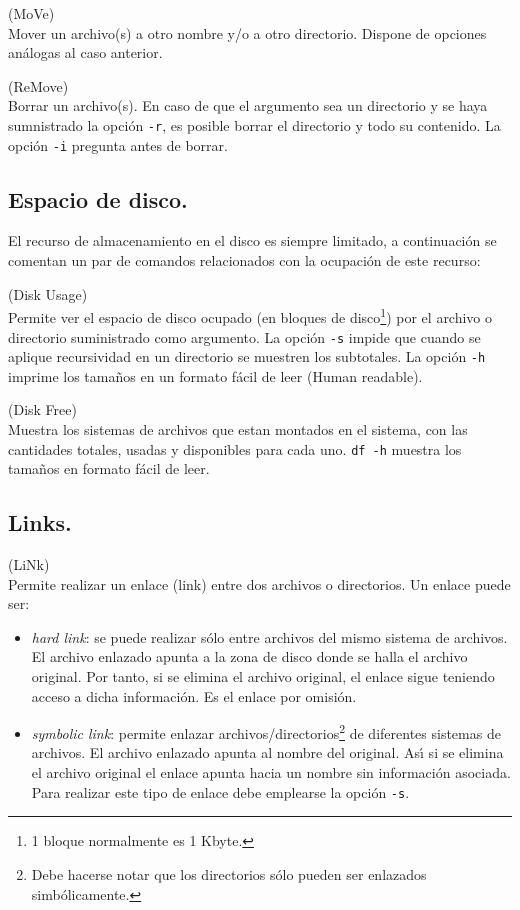 \noindent
{} (MoVe)\\
Mover un archivo(s) a otro nombre y/o a otro directorio. Dispone de
opciones an{\'a}logas al caso anterior.

\noindent
{} (ReMove)\\
Borrar un archivo(s). En caso de que el argumento sea un directorio y
se haya sumnistrado la opci{\'o}n {\verb+-r+}, es posible borrar el directorio
y todo su contenido. La opci{\'o}n {\verb+-i+} pregunta antes de borrar.

\subsection{Espacio de disco.}

El recurso de almacenamiento en el disco es siempre limitado, a
continuaci{\'o}n se comentan un par de comandos relacionados con la
ocupaci{\'o}n de este recurso:

\noindent
{} (Disk Usage)\\
Permite ver el espacio de disco ocupado (en bloques de
disco\footnote{1 bloque normalmente es 1 Kbyte.}) por el archivo o
directorio suministrado como argumento. La opci{\'o}n {\verb+-s+} impide que
cuando se aplique recursividad en un directorio se muestren los
subtotales. La opci{\'o}n {\verb+-h+} imprime los tama{\~n}os en un formato
f{\'a}cil de leer (Human readable).

\noindent
{} (Disk Free)\\
Muestra los sistemas de archivos que estan montados en el sistema, con
las cantidades totales, usadas y disponibles para cada uno. 
\verb+df -h+ muestra los tama\~nos en formato f\'acil de leer.

\subsection{Links.}

\noindent
{} (LiNk)\\
Permite realizar un enlace (link) entre dos archivos o directorios. Un
enlace puede ser:

\begin{itemize}
  
\item {\it hard link}: se puede realizar s{\'o}lo entre archivos del mismo
  sistema de archivos. El archivo enlazado apunta a la zona de disco
  donde se halla el archivo original. Por tanto, si se elimina el
  archivo original, el enlace sigue teniendo acceso a dicha
  informaci{\'o}n. Es el enlace por omisi{\'o}n.
  
\item {\it symbolic link}: permite enlazar
  archivos/directorios\footnote{Debe hacerse notar que los directorios
    s{\'o}lo pueden ser enlazados simb{\'o}licamente.} de diferentes sistemas
  de archivos.  El archivo enlazado apunta al nombre del original. As{\'\i}
  si se elimina el archivo original el enlace apunta hacia un nombre
  sin informaci{\'o}n asociada. Para realizar este tipo de enlace debe
  emplearse la opci{\'o}n {\verb+-s+}.

\end{itemize}

